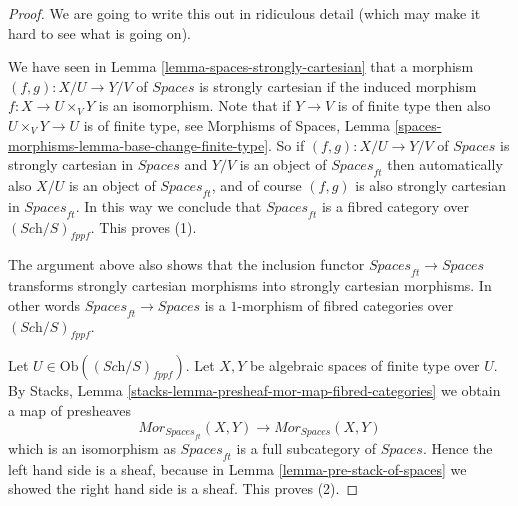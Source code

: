 \begin{proof}
We are going to write this out in ridiculous detail (which may make
it hard to see what is going on).

\medskip\noindent
We have seen in
Lemma \ref{lemma-spaces-strongly-cartesian}
that a morphism $(f, g) : X/U \to Y/V$ of $\textit{Spaces}$ is
strongly cartesian if the induced morphism $f : X \to U \times_V Y$
is an isomorphism. Note that if $Y \to V$ is of finite type
then also $U \times_V Y \to U$ is of finite type, see
Morphisms of Spaces,
Lemma \ref{spaces-morphisms-lemma-base-change-finite-type}.
So if $(f, g) : X/U \to Y/V$ of $\textit{Spaces}$ is
strongly cartesian in $\textit{Spaces}$ and $Y/V$ is an object
of $\textit{Spaces}_{ft}$ then automatically also $X/U$ is an
object of $\textit{Spaces}_{ft}$, and of course $(f, g)$ is
also strongly cartesian in $\textit{Spaces}_{ft}$. In this way
we conclude that $\textit{Spaces}_{ft}$ is a fibred category over
$(\textit{Sch}/S)_{fppf}$. This proves (1).

\medskip\noindent
The argument above also shows that the inclusion
functor $\textit{Spaces}_{ft} \to \textit{Spaces}$ transforms
strongly cartesian morphisms into strongly cartesian morphisms.
In other words $\textit{Spaces}_{ft} \to \textit{Spaces}$ is
a $1$-morphism of fibred categories over $(\textit{Sch}/S)_{fppf}$.

\medskip\noindent
Let $U \in \text{Ob}((\textit{Sch}/S)_{fppf})$.
Let $X, Y$ be algebraic spaces of finite type over $U$. By
Stacks, Lemma \ref{stacks-lemma-presheaf-mor-map-fibred-categories}
we obtain a map of presheaves
$$
\mathit{Mor}_{\textit{Spaces}_{ft}}(X, Y)
\longrightarrow
\mathit{Mor}_{\textit{Spaces}}(X, Y)
$$
which is an isomorphism as $\textit{Spaces}_{ft}$ is a full subcategory of
$\textit{Spaces}$. Hence the left hand side is a sheaf, because in
Lemma \ref{lemma-pre-stack-of-spaces}
we showed the right hand side is a sheaf. This proves (2).


\end{proof}

